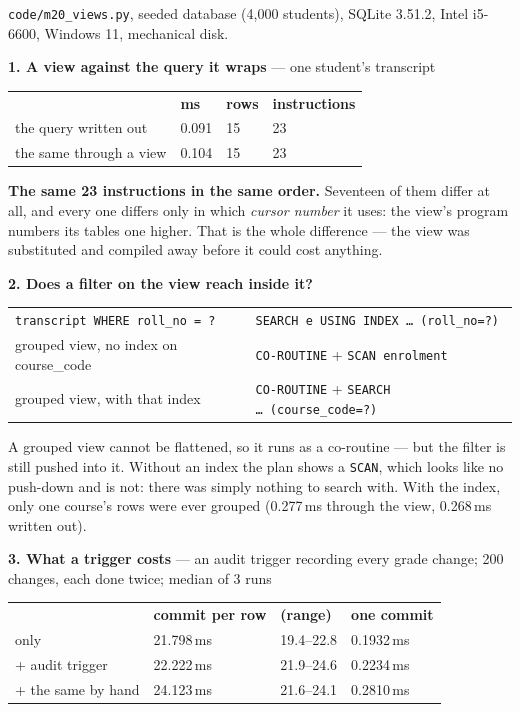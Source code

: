 \begin{measured}
\textsf{\footnotesize \texttt{code/m20\_views.py}, seeded database (4{,}000
students), SQLite 3.51.2, Intel i5-6600, Windows 11, mechanical disk.}

\medskip
\textbf{1. A view against the query it wraps} --- one student's transcript

\begin{tabular}{@{}L{6.4cm}R{2.0cm}R{1.6cm}R{2.6cm}@{}}
& \textbf{ms} & \textbf{rows} & \textbf{instructions} \\
the query written out & 0.091 & 15 & 23 \\
the same through a view & 0.104 & 15 & 23 \\
\end{tabular}

\smallskip
\textbf{The same 23 instructions in the same order.} Seventeen of them differ
at all, and every one differs only in which \emph{cursor number} it uses: the
view's program numbers its tables one higher. That is the whole difference ---
the view was substituted and compiled away before it could cost anything.

\medskip
\textbf{2. Does a filter on the view reach inside it?}

\begin{tabular}{@{}L{7.0cm}L{7.0cm}@{}}
\texttt{transcript WHERE roll\_no = ?} &
  \texttt{SEARCH e USING INDEX \dots\ (roll\_no=?)} \\
grouped view, no index on course\_code &
  \texttt{CO-ROUTINE} + \texttt{SCAN enrolment} \\
grouped view, with that index &
  \texttt{CO-ROUTINE} + \texttt{SEARCH \dots\ (course\_code=?)} \\
\end{tabular}

\smallskip
A grouped view cannot be flattened, so it runs as a co-routine --- but the
filter is still pushed into it. Without an index the plan shows a
\texttt{SCAN}, which looks like no push-down and is not: there was simply
nothing to search with. With the index, only one course's rows were ever
grouped (0.277\,ms through the view, 0.268\,ms written out).

\medskip
\textbf{3. What a trigger costs} --- an audit trigger recording every grade
change; 200 changes, each done twice; median of 3 runs

\begin{tabular}{@{}L{6.2cm}R{2.6cm}R{2.4cm}R{2.6cm}@{}}
& \textbf{commit per row} & \textbf{(range)} & \textbf{one commit} \\
 only & 21.798\,ms & 19.4--22.8 & 0.1932\,ms \\
 + audit trigger & 22.222\,ms & 21.9--24.6 & 0.2234\,ms \\
 + the same  by hand & 24.123\,ms & 21.6--24.1 &
  0.2810\,ms \\
\end{tabular}


\end{measured}
